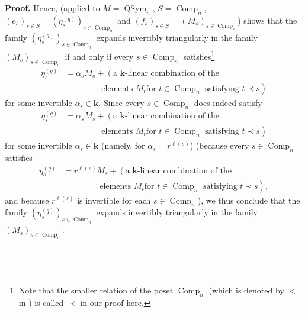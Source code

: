 \documentclass[numbers=enddot,12pt,final,onecolumn,notitlepage]{scrartcl}%
\theoremstyle{definition}
\newenvironment{proof}[1][Proof]{\noindent\textbf{#1.} }{\ \rule{0.5em}{0.5em}}
\newenvironment{verlong}{}{}
\begin{document}
\begin{verlong}
\begin{proof}
Hence, \cite[Remark 11.1.17 (b)]{GriRei} (applied to $M=\operatorname*{QSym}%
\nolimits_{n}$, $S=\operatorname*{Comp}\nolimits_{n}$, $\left(  e_{s}\right)
_{s\in S}=\left(  \eta_{s}^{\left(  q\right)  }\right)  _{s\in
\operatorname*{Comp}\nolimits_{n}}$ and $\left(  f_{s}\right)  _{s\in
S}=\left(  M_{s}\right)  _{s\in\operatorname*{Comp}\nolimits_{n}}$) shows that
the family $\left(  \eta_{s}^{\left(  q\right)  }\right)  _{s\in
\operatorname*{Comp}\nolimits_{n}}$ expands invertibly triangularly in the
family $\left(  M_{s}\right)  _{s\in\operatorname*{Comp}\nolimits_{n}}$ if and
only if every $s\in\operatorname*{Comp}\nolimits_{n}$ satisfies\footnote{Note
that the smaller relation of the poset $\operatorname*{Comp}\nolimits_{n}$
(which is denoted by $<$ in \cite[Remark 11.1.17 (b)]{GriRei}) is called
$\prec$ in our proof here.}%
\begin{align*}
\eta_{s}^{\left(  q\right)  }  &  =\alpha_{s}M_{s}+\left(  \text{a }%
\mathbf{k}\text{-linear combination of the}\right. \\
&  \ \ \ \ \ \ \ \ \ \ \ \ \ \ \ \ \ \ \ \ \left.  \text{elements }M_{t}\text{
for }t\in\operatorname*{Comp}\nolimits_{n}\text{ satisfying }t\prec s\right)
\end{align*}
for some invertible $\alpha_{s}\in\mathbf{k}$. Since every $s\in
\operatorname*{Comp}\nolimits_{n}$ does indeed satisfy%
\begin{align*}
\eta_{s}^{\left(  q\right)  }  &  =\alpha_{s}M_{s}+\left(  \text{a }%
\mathbf{k}\text{-linear combination of the}\right. \\
&  \ \ \ \ \ \ \ \ \ \ \ \ \ \ \ \ \ \ \ \ \left.  \text{elements }M_{t}\text{
for }t\in\operatorname*{Comp}\nolimits_{n}\text{ satisfying }t\prec s\right)
\end{align*}
for some invertible $\alpha_{s}\in\mathbf{k}$ (namely, for $\alpha_{s}%
=r^{\ell\left(  s\right)  }$) (because every $s\in\operatorname*{Comp}%
\nolimits_{n}$ satisfies%
\begin{align*}
\eta_{s}^{\left(  q\right)  }  &  =r^{\ell\left(  s\right)  }M_{s}+\left(
\text{a }\mathbf{k}\text{-linear combination of the}\right. \\
&  \ \ \ \ \ \ \ \ \ \ \ \ \ \ \ \ \ \ \ \ \left.  \text{elements }M_{t}\text{
for }t\in\operatorname*{Comp}\nolimits_{n}\text{ satisfying }t\prec s\right)
,
\end{align*}
and because $r^{\ell\left(  s\right)  }$ is invertible for each $s\in
\operatorname*{Comp}\nolimits_{n}$), we thus conclude that the family $\left(
\eta_{s}^{\left(  q\right)  }\right)  _{s\in\operatorname*{Comp}\nolimits_{n}%
}$ expands invertibly triangularly in the family $\left(  M_{s}\right)
_{s\in\operatorname*{Comp}\nolimits_{n}}$.


\end{proof}
\end{verlong}
\end{document}
